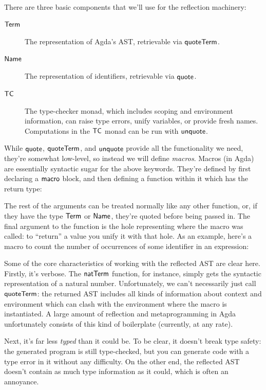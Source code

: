 \documentclass[draft, twocolumn]{article}
\theoremstyle{definition}
\theoremstyle{remark}
\begin{document}
There are three basic components that we'll use for the reflection machinery:
\begin{description}
  \item[\(\AgdaDatatype{Term}\)] The representation of Agda's AST, retrievable
    via \(\AgdaKeyword{quoteTerm}\).
  \item[\(\AgdaDatatype{Name}\)] The representation of identifiers, retrievable
    via \(\AgdaKeyword{quote}\).
  \item[\(\AgdaDatatype{TC}\)] The type-checker monad, which includes scoping
    and environment information, can raise type errors, unify variables, or
    provide fresh names. Computations in the \(\AgdaDatatype{TC}\) monad can be
    run with \(\AgdaKeyword{unquote}\).
\end{description}

While \(\AgdaKeyword{quote}\), \(\AgdaKeyword{quoteTerm}\), and
\(\AgdaKeyword{unquote}\) provide all the functionality we need, they're
somewhat low-level, so instead we will define \emph{macros}. Macros (in Agda)
are essentially syntactic sugar for the above keywords. They're defined by first
declaring a \(\AgdaKeyword{macro}\) block, and then defining a function within
it which has the return type:

The rest of the arguments can be treated normally like any other function, or,
if they have the type \(\AgdaDatatype{Term}\) or \(\AgdaDatatype{Name}\),
they're quoted before being passed in. The final argument to the function is the
hole representing where the macro was called: to ``return'' a value you unify
it with that hole. As an example, here's a macro to count the number of
occurrences of some identifier in an expression:

Some of the core characteristics of working with the reflected AST are clear
here. Firstly, it's verbose. The \(\AgdaFunction{natTerm}\) function, for
instance, simply gets the syntactic representation of a natural number.
Unfortunately, we can't necessarily just call \(\AgdaKeyword{quoteTerm}\): the
returned AST includes all kinds of information about context and environment
which can clash with the environment where the macro is instantiated. A large
amount of reflection and metaprogramming in Agda unfortunately consists of this
kind of boilerplate (currently, at any rate).

Next, it's far less \emph{typed} than it could be. To be clear, it doesn't break
type safety: the generated program is still type-checked, but you can generate
code with a type error in it without any difficulty. On the other end, the
reflected AST doesn't contain as much type information as it could, which is
often an annoyance. 
\end{document}
